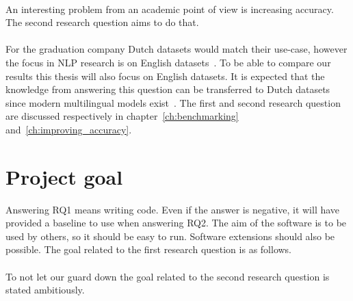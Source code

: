 \rqone \\[1mm]

An interesting problem from an academic point of view is increasing accuracy.
The second research question aims to do that.\\

\rqtwo \\[1mm]

For the graduation company Dutch datasets would match their use-case, however the focus in NLP research is on English datasets~\citep{cambria2014jumping,young2018recent}.
To be able to compare our results this thesis will also focus on English datasets.
It is expected that the knowledge from answering this question can be transferred to Dutch datasets since modern multilingual models exist~\citep{spacy2019models,subramanian2018learning,devlin2018}.
The first and second research question are discussed respectively in chapter~\ref{ch:benchmarking} and~\ref{ch:improving_accuracy}.

\section{Project goal}
\label{sec:project_goal}
Answering RQ1 means writing code.
Even if the answer is negative, it will have provided a baseline to use when answering RQ2.
The aim of the software is to be used by others, so it should be easy to run.
Software extensions should also be possible.
The goal related to the first research question is as follows.\\

\rgone \\

\noindent To not let our guard down the goal related to the second research question is stated ambitiously.\\

\rgtwo